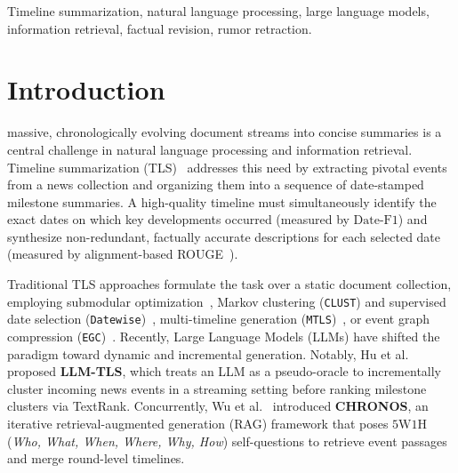 \documentclass[journal]{IEEEtran}
\begin{document}
\begin{IEEEkeywords}
Timeline summarization, natural language processing, large language models, information retrieval, factual revision, rumor retraction.
\end{IEEEkeywords}

\section{Introduction}
\label{sec:intro}

 massive, chronologically evolving document streams into concise summaries is a central challenge in natural language processing and information retrieval. Timeline summarization (TLS)~\cite{tran2013leveraging, martschat2018temporally, ghalandari2020examining} addresses this need by extracting pivotal events from a news collection and organizing them into a sequence of date-stamped milestone summaries. A high-quality timeline must simultaneously identify the exact dates on which key developments occurred (measured by $\text{Date-F1}$) and synthesize non-redundant, factually accurate descriptions for each selected date (measured by alignment-based ROUGE~\cite{martschat2017improving}).

Traditional TLS approaches formulate the task over a static document collection, employing submodular optimization~\cite{martschat2018temporally}, Markov clustering (\texttt{CLUST}) and supervised date selection (\texttt{Datewise})~\cite{ghalandari2020examining}, multi-timeline generation (\texttt{MTLS})~\cite{yu2021multi}, or event graph compression (\texttt{EGC})~\cite{li2021timeline}. Recently, Large Language Models (LLMs) have shifted the paradigm toward dynamic and incremental generation. Notably, Hu et al.~\cite{hu2024moments} proposed \textbf{LLM-TLS}, which treats an LLM as a pseudo-oracle to incrementally cluster incoming news events in a streaming setting before ranking milestone clusters via TextRank. Concurrently, Wu et al.~\cite{wu2025unfolding} introduced \textbf{CHRONOS}, an iterative retrieval-augmented generation (RAG) framework that poses $5\text{W}1\text{H}$ (\textit{Who, What, When, Where, Why, How}) self-questions to retrieve event passages and merge round-level timelines.
\end{document}
